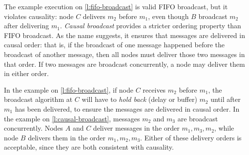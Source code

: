 The example execution on \autoref{l:fifo-broadcast} is valid FIFO broadcast, but it violates causality: node $C$ delivers $m_2$ before $m_1$, even though $B$ broadcast $m_2$ after delivering $m_1$.
\emph{Causal broadcast} provides a stricter ordering property than FIFO broadcast.
As the name suggests, it ensures that messages are delivered in causal order: that is, if the broadcast of one message happened before the broadcast of another message, then all nodes must deliver those two messages in that order.
If two messages are broadcast concurrently, a node may deliver them in either order.

In the example on \autoref{l:fifo-broadcast}, if node $C$ receives $m_2$ before $m_1$, the broadcast algorithm at $C$ will have to \emph{hold back} (delay or buffer) $m_2$ until after $m_1$ has been delivered, to ensure the messages are delivered in causal order.
In the example on \autoref{l:causal-broadcast}, messages $m_2$ and $m_3$ are broadcast concurrently.
Nodes $A$ and $C$ deliver messages in the order $m_1, m_3, m_2$, while node $B$ delivers them in the order $m_1, m_2, m_3$.
Either of these delivery orders is acceptable, since they are both consistent with causality.

